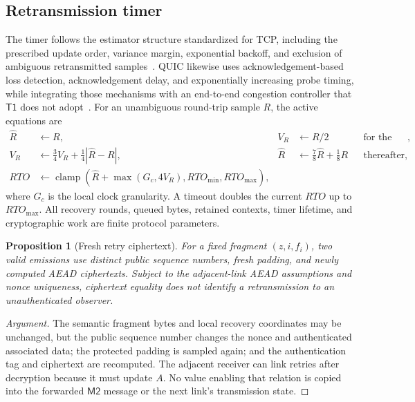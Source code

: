 \documentclass[11pt,oneside]{article}
\newcommand{\Mtwo}{\ensuremath{\mathsf{M2}}}
\newcommand{\Tone}{\ensuremath{\mathsf{T1}}}
\newtheorem{proposition}{Proposition}
\begin{document}
\subsection{Retransmission timer}

The timer follows the estimator structure standardized for TCP, including the prescribed update order, variance margin, exponential backoff, and exclusion of ambiguous retransmitted samples~\cite{rfc6298}. QUIC likewise uses acknowledgement-based loss detection, acknowledgement delay, and exponentially increasing probe timing, while integrating those mechanisms with an end-to-end congestion controller that \Tone{} does not adopt~\cite{rfc9002}. For an unambiguous round-trip sample $R$, the active equations are
\begin{align}
\widehat R &\gets R, & V_R &\gets R/2 &&\text{for the first sample},\label{eq:rtofirst}\\
V_R &\gets \tfrac34V_R+\tfrac14|\widehat R-R|, &
\widehat R &\gets \tfrac78\widehat R+\tfrac18R &&\text{thereafter},\label{eq:rtolater}\\
RTO &\gets \operatorname{clamp}\!\left(\widehat R+\max(G_c,4V_R),RTO_{\min},RTO_{\max}\right),\label{eq:rto}
\end{align}
where $G_c$ is the local clock granularity. A timeout doubles the current $RTO$ up to $RTO_{\max}$. All recovery rounds, queued bytes, retained contexts, timer lifetime, and cryptographic work are finite protocol parameters.

\begin{proposition}[Fresh retry ciphertext]
For a fixed fragment $(z,i,f_i)$, two valid emissions use distinct public sequence numbers, fresh padding, and newly computed AEAD ciphertexts. Subject to the adjacent-link AEAD assumptions and nonce uniqueness, ciphertext equality does not identify a retransmission to an unauthenticated observer.
\end{proposition}

\begin{proof}[Argument]
The semantic fragment bytes and local recovery coordinates may be unchanged, but the public sequence number changes the nonce and authenticated associated data; the protected padding is sampled again; and the authentication tag and ciphertext are recomputed. The adjacent receiver can link retries after decryption because it must update $A$. No value enabling that relation is copied into the forwarded \Mtwo{} message or the next link's transmission state.
\end{proof}
\end{document}
